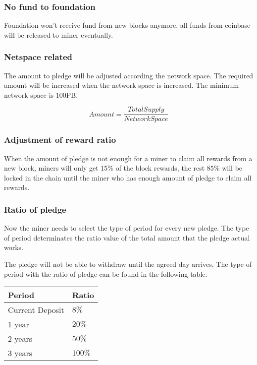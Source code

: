 \subsubsection{No fund to foundation}
\begin{flushleft}
    Foundation won't receive fund from new blocks anymore, all funds from coinbase will be released to miner eventually.
\end{flushleft}
\subsubsection{Netspace related}
\begin{flushleft}
    The amount to pledge will be adjusted according the network space. The required amount will be increased when the network space is increased. The minimum network space is 100PB.
\end{flushleft}
\begin{equation}
    Amount = \frac{TotalSupply}{NetworkSpace}
\end{equation}
\subsubsection{Adjustment of reward ratio}
\begin{flushleft}
    When the amount of pledge is not enough for a miner to claim all rewards from a new block, miners will only get $15\%$ of the block rewards, the rest $85\%$ will be locked in the chain until the miner who has enough amount of pledge to claim all rewards.
\end{flushleft}
\subsubsection{Ratio of pledge}
\begin{flushleft}
    Now the miner needs to select the type of period for every new pledge. The type of period determinates the ratio value of the total amount that the pledge actual works.
\end{flushleft}
\begin{flushleft}
    The pledge will not be able to withdraw until the agreed day arrives. The type of period with the ratio of pledge can be found in the following table.
\end{flushleft}
\begin{tabular}{ |p{5cm}|p{3cm}| }
    \hline
    \rowcolor{lightgray}\textbf{Period} & \textbf{Ratio} \\[5pt]
    \hline
    Current Deposit & $8\%$ \\[5pt]
    \rowcolor{lightgray!30} 1 year & $20\%$ \\[5pt]
    2 years & $50\%$ \\[5pt]
    \rowcolor{lightgray!30} 3 years & $100\%$ \\[5pt]
    \hline
\end{tabular}
